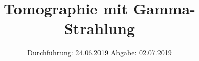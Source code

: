 

\subject{VERSUCH NUMMER 14}
\title{Tomographie mit Gamma-Strahlung}
\date{
  Durchführung: 24.06.2019
  \hspace{3em}
  Abgabe: 02.07.2019
}



\thispagestyle{empty}
\maketitle
\thispagestyle{empty}
\tableofcontents
\newpage
\setcounter{page}{1}

% 

% 




\nocite{*}
\printbibliography


